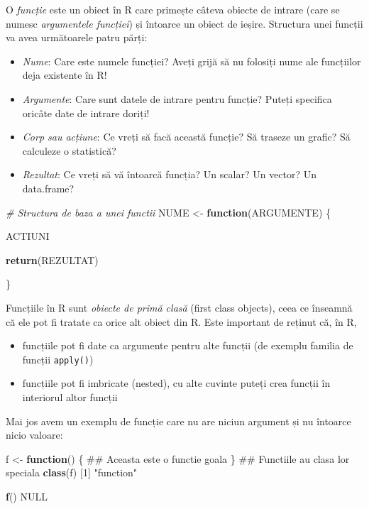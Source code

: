 \documentclass[]{article}
\newenvironment{Shaded}{\begin{snugshade}}{\end{snugshade}}
\newcommand{\KeywordTok}[1]{\textcolor[rgb]{0.13,0.29,0.53}{\textbf{#1}}}
\newcommand{\DecValTok}[1]{\textcolor[rgb]{0.00,0.00,0.81}{#1}}
\newcommand{\StringTok}[1]{\textcolor[rgb]{0.31,0.60,0.02}{#1}}
\newcommand{\CommentTok}[1]{\textcolor[rgb]{0.56,0.35,0.01}{\textit{#1}}}
\newcommand{\OtherTok}[1]{\textcolor[rgb]{0.56,0.35,0.01}{#1}}
\newcommand{\ControlFlowTok}[1]{\textcolor[rgb]{0.13,0.29,0.53}{\textbf{#1}}}
\newcommand{\NormalTok}[1]{#1}
\begin{document}
O \emph{funcție} este un obiect în R care primește câteva obiecte de
intrare (care se numesc \emph{argumentele funcției}) și întoarce un
obiect de ieșire. Structura unei funcții va avea următoarele patru
părți:

\begin{itemize}
\item
  \emph{Nume}: Care este numele funcției? Aveți grijă să nu folosiți
  nume ale funcțiilor deja existente în R!
\item
  \emph{Argumente}: Care sunt datele de intrare pentru funcție? Puteți
  specifica oricâte date de intrare doriți!
\item
  \emph{Corp sau acțiune}: Ce vreți să facă această funcție? Să traseze
  un grafic? Să calculeze o statistică?
\item
  \emph{Rezultat}: Ce vreți să vă întoarcă funcția? Un scalar? Un
  vector? Un data.frame?
\end{itemize}

\begin{Shaded}
\begin{Highlighting}[]
\CommentTok{# Structura de baza a unei functii}
\NormalTok{NUME <-}\StringTok{ }\ControlFlowTok{function}\NormalTok{(ARGUMENTE) \{}

\NormalTok{  ACTIUNI}

  \KeywordTok{return}\NormalTok{(REZULTAT)}

\NormalTok{\}}
\end{Highlighting}
\end{Shaded}

Funcțiile în R sunt \emph{obiecte de primă clasă} (first class objects),
ceea ce înseamnă că ele pot fi tratate ca orice alt obiect din R. Este
important de reținut că, în R,

\begin{itemize}
\item
  funcțiile pot fi date ca argumente pentru alte funcții (de exemplu
  familia de funcții \texttt{apply()})
\item
  funcțiile pot fi imbricate (nested), cu alte cuvinte puteți crea
  funcții în interiorul altor funcții
\end{itemize}

Mai jos avem un exemplu de funcție care nu are niciun argument și nu
întoarce nicio valoare:

\begin{Shaded}
\begin{Highlighting}[]
\NormalTok{f <-}\StringTok{ }\ControlFlowTok{function}\NormalTok{() \{}
\NormalTok{        ## Aceasta este o functie goala}
\NormalTok{\}}
\NormalTok{## Functiile au clasa lor speciala }
\KeywordTok{class}\NormalTok{(f)  }
\NormalTok{[}\DecValTok{1}\NormalTok{] }\StringTok{"function"}

\KeywordTok{f}\NormalTok{()       }
\OtherTok{NULL}
\end{Highlighting}
\end{Shaded}
\end{document}
